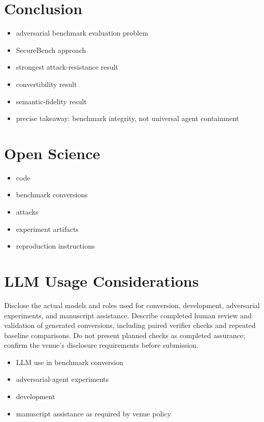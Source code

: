 \documentclass[conference]{IEEEtran}
\newcommand{\draft}[1]{%
    \par\noindent
    {\color{gray}\small #1}
    \par
}
\newcommand{\secondtalk}[1]{{\color{secondtalkblue}#1}}
\begin{document}
\section{Conclusion}

\draft{
\begin{itemize}
    \item adversarial benchmark evaluation problem
    \item SecureBench approach
    \item strongest attack-resistance result
    \item convertibility result
    \item semantic-fidelity result
    \item precise takeaway: benchmark integrity, not universal agent containment
\end{itemize}
}



\section*{Open Science}

\draft{
\begin{itemize}
    \item code
    \item benchmark conversions
    \item attacks
    \item experiment artifacts
    \item reproduction instructions
\end{itemize}
}

\section*{LLM Usage Considerations}

\draft{\secondtalk{Disclose the actual models and roles used for conversion, development, adversarial experiments, and manuscript assistance. Describe completed human review and validation of generated conversions, including paired verifier checks and repeated baseline comparisons. Do not present planned checks as completed assurance; confirm the venue's disclosure requirements before submission.}}

\draft{
\begin{itemize}
    \item LLM use in benchmark conversion
    \item adversarial-agent experiments
    \item development
    \item manuscript assistance as required by venue policy
\end{itemize}
}





\end{document}
